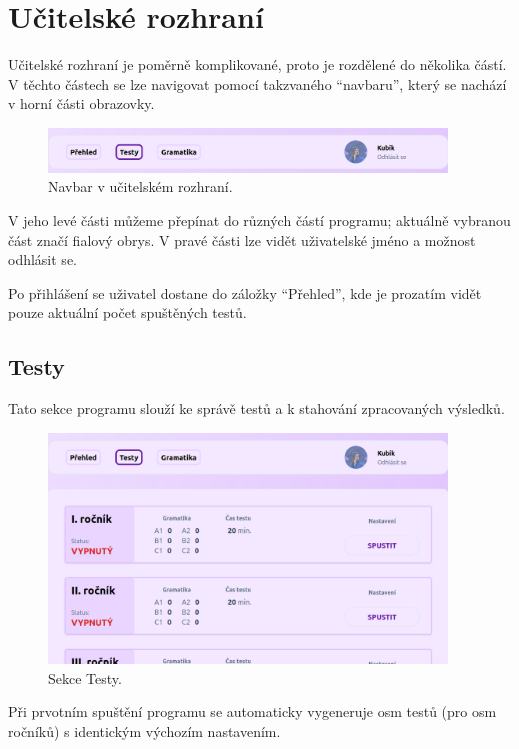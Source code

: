 \section{Učitelské rozhraní}
\label{sec:admin}

Učitelské rozhraní je poměrně komplikované, proto je rozdělené do několika částí. V těchto částech se lze navigovat pomocí takzvaného \enquote{navbaru}, který se nachází v horní části obrazovky.

\begin{figure}[H]
    \centering
    \includegraphics[width=400px]{images/01design/navbar.png}
    \caption{Navbar v učitelském rozhraní.}
\end{figure}

V jeho levé části můžeme přepínat do různých částí programu; aktuálně vybranou část značí fialový obrys. V pravé části lze vidět uživatelské jméno a možnost odhlásit se.

Po přihlášení se uživatel dostane do záložky \enquote{Přehled}, kde je prozatím vidět pouze aktuální počet spuštěných testů.

\subsection{Testy}

Tato sekce programu slouží ke správě testů a k stahování zpracovaných výsledků.

\begin{figure}[H]
    \centering
    \includegraphics[width=400px]{images/01design/tests.png}
    \caption{Sekce Testy.}
\end{figure}

Při prvotním spuštění programu se automaticky vygeneruje osm testů (pro osm ročníků) s identickým výchozím nastavením. 


